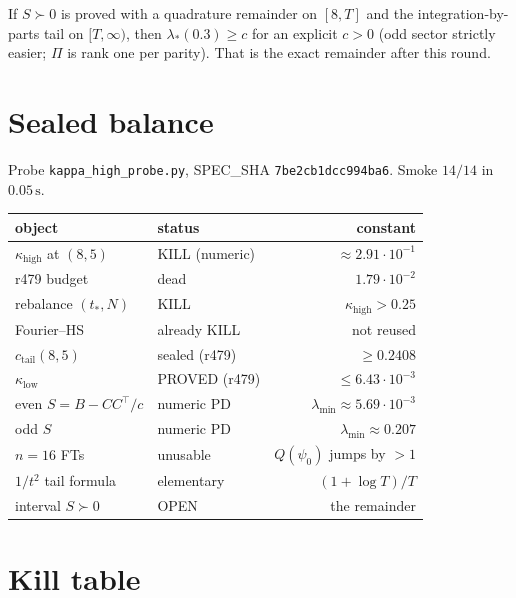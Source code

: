 \documentclass[11pt]{article}
\theoremstyle{remark}
\begin{document}
If $S\succ0$ is proved with a quadrature remainder on $[8,T]$
and the integration-by-parts tail on $[T,\infty)$, then
$\lambda_*(0.3)\ge c$ for an explicit $c>0$
(odd sector strictly easier; $\Pi$ is rank one per parity).
That is the exact remainder after this round.

\section{Sealed balance}

Probe \texttt{kappa\_high\_probe.py},
SPEC\_SHA \texttt{7be2cb1dcc994ba6}.
Smoke $14/14$ in $0.05\,\mathrm{s}$.

\begin{center}
\small
\begin{tabular}{@{}llr@{}}
\toprule
object & status & constant\\
\midrule
$\kappa_{\mathrm{high}}$ at $(8,5)$ & KILL (numeric) & $\approx2.91\cdot10^{-1}$\\
r479 budget & dead & $1.79\cdot10^{-2}$\\
rebalance $(t_*,N)$ & KILL & $\kappa_{\mathrm{high}}>0.25$\\
Fourier--HS & already KILL & not reused\\
$c_{\mathrm{tail}}(8,5)$ & sealed (r479) & $\ge0.2408$\\
$\kappa_{\mathrm{low}}$ & PROVED (r479) & $\le6.43\cdot10^{-3}$\\
even $S=B-CC^\top/c$ & numeric PD & $\lambda_{\min}\approx5.69\cdot10^{-3}$\\
odd $S$ & numeric PD & $\lambda_{\min}\approx0.207$\\
$n=16$ FTs & unusable & $Q(\psi_0)$ jumps by $>1$\\
$1/t^2$ tail formula & elementary & $(1+\log T)/T$\\
interval $S\succ0$ & OPEN & the remainder\\
\bottomrule
\end{tabular}
\end{center}

\section{Kill table}
\end{document}
